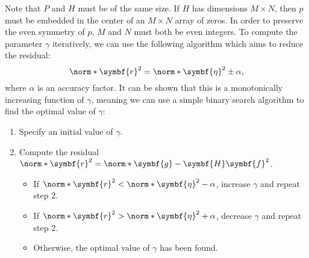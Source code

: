 \documentclass{article}
\begin{document}
Note that \(P\) and \(H\) must be of the same size. If \(H\) has
dimensions \(M \times N\), then \(p\) must be embedded in the center of
an \(M \times N\) array of zeros. In order to preserve the even symmetry
of \(p\), \(M\) and \(N\) must both be even integers. To compute the
parameter \(\gamma\) iteratively, we can use the following algorithm
which aims to reduce the residual:
\begin{equation*}
    \norm*{\symbf{r}}^2 = \norm*{\symbf{\eta}}^2 \pm \alpha,
\end{equation*}
where \(\alpha\) is an accuracy factor. It can be shown that this is a
monotonically increasing function of \(\gamma\), meaning we can use a
simple binary search algorithm to find the optimal value of \(\gamma\):
\begin{enumerate}
    \item Specify an initial value of \(\gamma\).
    \item Compute the residual \(\norm*{\symbf{r}}^2 = \norm*{\symbf{g}
          - \symbf{H} \symbf{f}}^2\).
          \begin{itemize}
              \item If \(\norm*{\symbf{r}}^2 < \norm*{\symbf{\eta}}^2 -
                    \alpha\), increase \(\gamma\) and repeat step 2.
              \item If \(\norm*{\symbf{r}}^2 > \norm*{\symbf{\eta}}^2 +
                    \alpha\), decrease \(\gamma\) and repeat step 2.
              \item Otherwise, the optimal value of \(\gamma\) has been
                    found.
          \end{itemize}
\end{enumerate}
\end{document}
